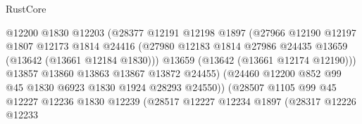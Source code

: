 \begin{lexlean}{RustCore}
\begin{coremodule}
                                      @12200
                                      @1830
                                      @12203
                                      (@28377
                                        @12191
                                        @12198
                                        @1897
                                        (@27966
                                          @12190
                                          @12197
                                          @1807
                                          @12173
                                          @1814
                                          @24416
                                          (@27980
                                            @12183
                                            @1814
                                            @27986
                                            @24435
                                            @13659
                                            (@13642 (@13661 @12184 @1830)))
                                          @13659
                                          (@13642 (@13661 @12174 @12190)))
                                        @13857
                                        @13860
                                        @13863
                                        @13867
                                        @13872
                                        @24455)
                                      (@24460
                                        @12200
                                        @852
                                        @99
                                        @45
                                        @1830
                                        @6923
                                        @1830
                                        @1924
                                        @28293
                                        @24550))
                                    (@28507
                                      @1105
                                      @99
                                      @45
                                      @12227
                                      @12236
                                      @1830
                                      @12239
                                      (@28517
                                        @12227
                                        @12234
                                        @1897
                                        (@28317
                                          @12226
                                          @12233

\end{coremodule}
\end{lexlean}
